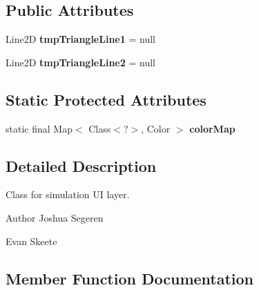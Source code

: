 \subsection*{Public Attributes}
\begin{DoxyCompactItemize}
\item 
\hypertarget{classairhockeyjava_1_1graphics_1_1_gui_layer_ac78b84c40a09d7431fd6864404f701a2}{}Line2\+D {\bfseries tmp\+Triangle\+Line1} = null\label{classairhockeyjava_1_1graphics_1_1_gui_layer_ac78b84c40a09d7431fd6864404f701a2}

\item 
\hypertarget{classairhockeyjava_1_1graphics_1_1_gui_layer_a8fd8687f8f44dcb473b875572dfba5dc}{}Line2\+D {\bfseries tmp\+Triangle\+Line2} = null\label{classairhockeyjava_1_1graphics_1_1_gui_layer_a8fd8687f8f44dcb473b875572dfba5dc}

\end{DoxyCompactItemize}
\subsection*{Static Protected Attributes}
\begin{DoxyCompactItemize}
\item 
static final Map$<$ Class$<$?$>$, Color $>$ {\bfseries color\+Map}
\end{DoxyCompactItemize}


\subsection{Detailed Description}
Class for simulation U\+I layer.

\begin{DoxyAuthor}{Author}
Joshua Segeren 

Evan Skeete 
\end{DoxyAuthor}


\subsection{Member Function Documentation}
\hypertarget{classairhockeyjava_1_1graphics_1_1_gui_layer_acd017d984424d676782e80f69286f31b}{}

